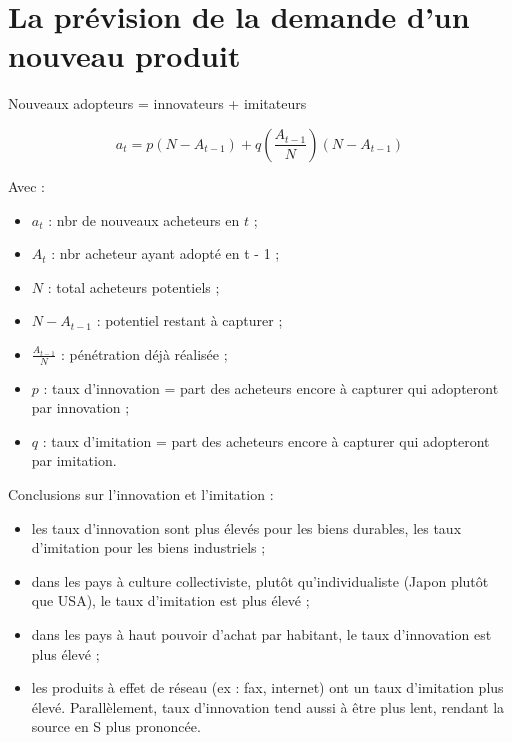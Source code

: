 		
	\section{La prévision de la demande d'un nouveau produit}
		
		
	Nouveaux adopteurs = innovateurs + imitateurs
		
	$$a_t = p(N - A_{t - 1}) + q( \frac{A_{t - 1}}{N} ) ( N - A_{t - 1})$$

	Avec :
		
	\begin{itemize}
		\item $a_t$ : nbr de nouveaux acheteurs en $t$ ;
		\item $A_t$ : nbr acheteur ayant adopté en t - 1 ;
		\item $N$ : total acheteurs potentiels ;
		\item $N - A_{t - 1}$ : potentiel restant à capturer ;
		\item $ \frac{A_{t - 1}}{N}$ : pénétration déjà réalisée ;
		\item $p$ : taux d'innovation = part des acheteurs encore à capturer qui adopteront par innovation ;
		\item $q$ : taux d'imitation = part des acheteurs encore à capturer qui adopteront par imitation.
	\end{itemize}
		
	Conclusions sur l'innovation et l'imitation :
	
	\begin{itemize}
		\item les taux d'innovation sont plus élevés pour les biens durables, les taux d'imitation pour les biens industriels ;
		\item dans les pays à culture collectiviste, plutôt qu'individualiste (Japon plutôt que USA), le taux d'imitation est plus élevé ;
		\item dans les pays à haut pouvoir d'achat par habitant, le taux d'innovation est plus élevé ;
		\item les produits à effet de réseau (ex : fax, internet) ont un taux d'imitation plus élevé. Parallèlement, taux d'innovation tend aussi à être plus lent, rendant la source en S plus prononcée.
	\end{itemize}
		
		
